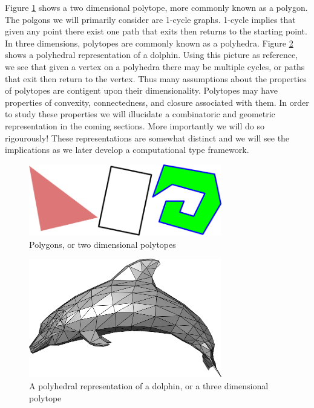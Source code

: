 Figure \ref{fig:polygons}
shows a two dimensional polytope, more commonly
known as a polygon. The polgons we will primarily consider are 1-cycle
graphs. 1-cycle implies that given any point there exist one path that exits
then returns to the starting point.
In three dimensions, polytopes are commonly known as a polyhedra.
Figure \ref{fig:polyhedra} shows a polyhedral representation of a dolphin.
Using this picture as reference, we see that given a vertex on a polyhedra
there may be
multiple cycles, or paths that exit then return to the vertex.
Thus many assumptions about the properties of polytopes are contigent upon
their dimensionality.
Polytopes may have properties of convexity,
connectedness,
and closure associated with them. In order to study these properties
we will illucidate a combinatoric and geometric representation
in the coming sections. More importantly we will do so rigourously!
These representations are somewhat distinct and we will see the
implications as we later develop a computational type framework.

\begin{figure}[h!]
  \centering
    \includegraphics[width=0.75\textwidth]{img/assorted_polygons.png}
  \caption{Polygons, or two dimensional polytopes}
  \label{fig:polygons}
\end{figure}

\begin{figure}[h!]
  \centering
    \includegraphics[width=0.75\textwidth]{img/Dolphin_triangle_mesh.png}
  \caption{A polyhedral representation of a dolphin, or a three dimensional polytope}
  \label{fig:polyhedra}
\end{figure}

